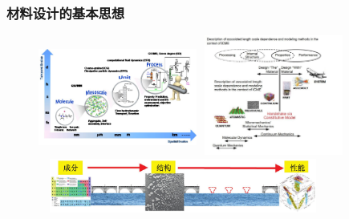 \frame
{
	\frametitle{材料设计的基本思想}
\begin{figure}[h!]
\vspace*{-0.10in}
\centering
\includegraphics[height=1.50in,width=2.05in,viewport=0 0 775 480,clip]{Figures/Multi_Scale-2.jpeg}
\includegraphics[height=1.55in,width=1.90in,viewport=0 0 170 150,clip]{Figures/Multi_Scale-6.jpg}
\includegraphics[height=0.70in,width=3.75in]{Figures/MGE-2.png}
\label{MGE}
\end{figure}
{\fontsize{7.2pt}{5.0pt}}
}

